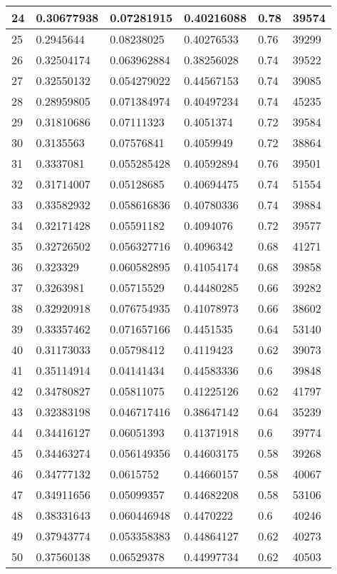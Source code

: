 \begin{longtable}{|l|l|l|l|l|l|}
24 & 0.30677938 & 0.07281915 & 0.40216088 & 0.78 & 39574 \\ \hline 
25 & 0.2945644 & 0.08238025 & 0.40276533 & 0.76 & 39299 \\ \hline 
26 & 0.32504174 & 0.063962884 & 0.38256028 & 0.74 & 39522 \\ \hline 
27 & 0.32550132 & 0.054279022 & 0.44567153 & 0.74 & 39085 \\ \hline 
28 & 0.28959805 & 0.071384974 & 0.40497234 & 0.74 & 45235 \\ \hline 
29 & 0.31810686 & 0.07111323 & 0.4051374 & 0.72 & 39584 \\ \hline 
30 & 0.3135563 & 0.07576841 & 0.4059949 & 0.72 & 38864 \\ \hline 
31 & 0.3337081 & 0.055285428 & 0.40592894 & 0.76 & 39501 \\ \hline 
32 & 0.31714007 & 0.05128685 & 0.40694475 & 0.74 & 51554 \\ \hline 
33 & 0.33582932 & 0.058616836 & 0.40780336 & 0.74 & 39884 \\ \hline 
34 & 0.32171428 & 0.05591182 & 0.4094076 & 0.72 & 39577 \\ \hline 
35 & 0.32726502 & 0.056327716 & 0.4096342 & 0.68 & 41271 \\ \hline 
36 & 0.323329 & 0.060582895 & 0.41054174 & 0.68 & 39858 \\ \hline 
37 & 0.3263981 & 0.05715529 & 0.44480285 & 0.66 & 39282 \\ \hline 
38 & 0.32920918 & 0.076754935 & 0.41078973 & 0.66 & 38602 \\ \hline 
39 & 0.33357462 & 0.071657166 & 0.4451535 & 0.64 & 53140 \\ \hline 
40 & 0.31173033 & 0.05798412 & 0.4119423 & 0.62 & 39073 \\ \hline 
41 & 0.35114914 & 0.04141434 & 0.44583336 & 0.6 & 39848 \\ \hline 
42 & 0.34780827 & 0.05811075 & 0.41225126 & 0.62 & 41797 \\ \hline 
43 & 0.32383198 & 0.046717416 & 0.38647142 & 0.64 & 35239 \\ \hline 
44 & 0.34416127 & 0.06051393 & 0.41371918 & 0.6 & 39774 \\ \hline 
45 & 0.34463274 & 0.056149356 & 0.44603175 & 0.58 & 39268 \\ \hline 
46 & 0.34777132 & 0.0615752 & 0.44660157 & 0.58 & 40067 \\ \hline 
47 & 0.34911656 & 0.05099357 & 0.44682208 & 0.58 & 53106 \\ \hline 
48 & 0.38331643 & 0.060446948 & 0.4470222 & 0.6 & 40246 \\ \hline 
49 & 0.37943774 & 0.053358383 & 0.44864127 & 0.62 & 40273 \\ \hline 
50 & 0.37560138 & 0.06529378 & 0.44997734 & 0.62 & 40503 \\ \hline 
\end{longtable}